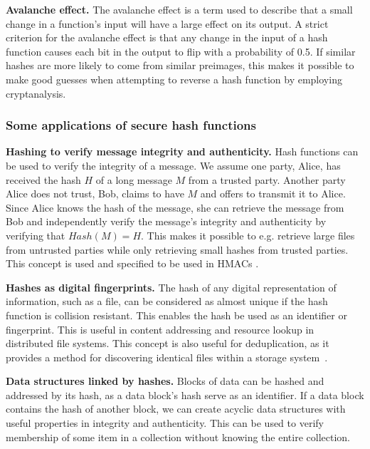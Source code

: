 {\bf Avalanche effect.}
The avalanche effect is a term used to describe that a small change in a function's input will have a large effect on its output. A strict criterion for the avalanche effect is that any change in the input of a hash function causes each bit in the output to flip with a probability of 0.5. If similar hashes are more likely to come from similar preimages, this makes it possible to make good guesses when attempting to reverse a hash function by employing cryptanalysis.

\subsubsection{Some applications of secure hash functions}

{\bf Hashing to verify message integrity and authenticity.}
Hash functions can be used to verify the integrity of a message. We assume one party, Alice, has received the hash $H$ of a long message $M$ from a trusted party. Another party Alice does not trust, Bob, claims to have $M$ and offers to transmit it to Alice. Since Alice knows the hash of the message, she can retrieve the message from Bob and independently verify the message's integrity and authenticity by verifying that $Hash(M) = H$. This makes it possible to e.g. retrieve large files from untrusted parties while only retrieving small hashes from trusted parties. This concept is used and specified to be used in HMACs \cite[p.~158--164]{lindell2014introduction}.

{\bf Hashes as digital fingerprints.}
The hash of any digital representation of information, such as a file, can be considered as almost unique if the hash function is collision resistant. This enables the hash be used as an identifier or fingerprint. This is useful in content addressing and resource lookup in distributed file systems. This concept is also useful for deduplication, as it provides a method for discovering identical files within a storage system~\cite[p.~182-183]{lindell2014introduction}. 

{\bf Data structures linked by hashes.}
Blocks of data can be hashed and addressed by its hash, as a data block's hash serve as an identifier. If a data block contains the hash of another block, we can create acyclic data structures with useful properties in integrity and authenticity. This can be used to verify membership of some item in a collection without knowing the entire collection.

